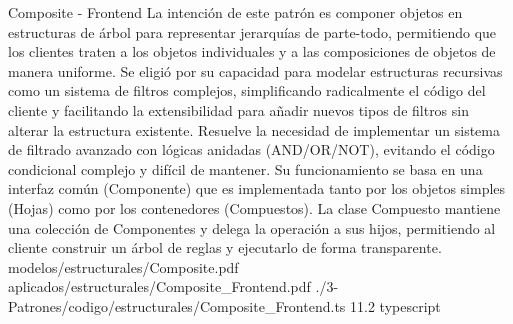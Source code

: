 
\Patron
    {Composite - Frontend}
    {La intención de este patrón es componer objetos en estructuras de árbol para representar jerarquías de parte-todo, permitiendo que los clientes traten a los objetos individuales y a las composiciones de objetos de manera uniforme. Se eligió por su capacidad para modelar estructuras recursivas como un sistema de filtros complejos, simplificando radicalmente el código del cliente y facilitando la extensibilidad para añadir nuevos tipos de filtros sin alterar la estructura existente.}
    {Resuelve la necesidad de implementar un sistema de filtrado avanzado con lógicas anidadas (AND/OR/NOT), evitando el código condicional complejo y difícil de mantener. Su funcionamiento se basa en una interfaz común (Componente) que es implementada tanto por los objetos simples (Hojas) como por los contenedores (Compuestos). La clase Compuesto mantiene una colección de Componentes y delega la operación a sus hijos, permitiendo al cliente construir un árbol de reglas y ejecutarlo de forma transparente.}
    {modelos/estructurales/Composite.pdf}
    {aplicados/estructurales/Composite_Frontend.pdf}
    {./3-Patrones/codigo/estructurales/Composite_Frontend.ts}
    {1}{1.2}
    {typescript}
\newpage

